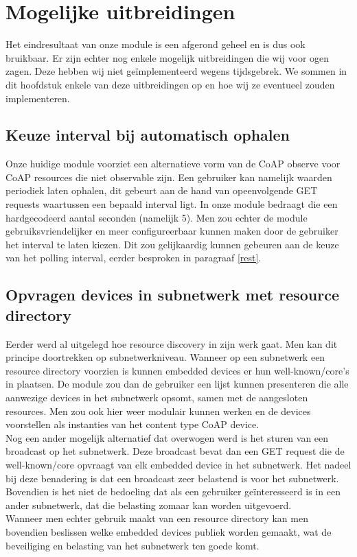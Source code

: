 \chapter{Mogelijke uitbreidingen} \label{uitbreidingen}
Het eindresultaat van onze module is een afgerond geheel en is dus ook bruikbaar. Er zijn echter nog enkele mogelijk uitbreidingen die wij voor ogen zagen. Deze hebben wij niet ge\"{i}mplementeerd wegens tijdsgebrek. We sommen in dit hoofdstuk enkele van deze uitbreidingen op en hoe wij ze eventueel zouden implementeren.

\section{Keuze interval bij automatisch ophalen}
Onze huidige module voorziet een alternatieve vorm van de CoAP observe voor CoAP resources die niet observable zijn. Een gebruiker kan namelijk waarden periodiek laten ophalen, dit gebeurt aan de hand van opeenvolgende GET requests waartussen een bepaald interval ligt. In onze module bedraagt die een hardgecodeerd aantal seconden (namelijk 5). Men zou echter de module gebruiksvriendelijker en meer configureerbaar kunnen maken door de gebruiker het interval te laten kiezen. Dit zou gelijkaardig kunnen gebeuren aan de keuze van het polling interval, eerder besproken in paragraaf \ref{rest}.

\section{Opvragen devices in subnetwerk met resource directory}
Eerder werd al uitgelegd hoe resource discovery in zijn werk gaat. Men kan dit principe doortrekken op subnetwerkniveau. Wanneer op een subnetwerk een resource directory voorzien is kunnen embedded devices er hun well-known/core's in plaatsen. De module zou dan de gebruiker een lijst kunnen presenteren die alle aanwezige devices in het subnetwerk opsomt, samen met de aangesloten resources. Men zou ook hier weer modulair kunnen werken en de devices voorstellen als instanties van het content type CoAP device.\\

Nog een ander mogelijk alternatief dat overwogen werd is het sturen van een broadcast op het subnetwerk. Deze broadcast bevat dan een GET request die de well-known/core opvraagt van elk embedded device in het subnetwerk. Het nadeel bij deze benadering is dat een broadcast zeer belastend is voor het subnetwerk. Bovendien is het niet de bedoeling dat als een gebruiker ge\"{i}nteresseerd is in een ander subnetwerk, dat die belasting zomaar kan worden uitgevoerd.\\
Wanneer men echter gebruik maakt van een resource directory kan men bovendien beslissen welke embedded devices publiek worden gemaakt, wat de beveiliging en belasting van het subnetwerk ten goede komt.

